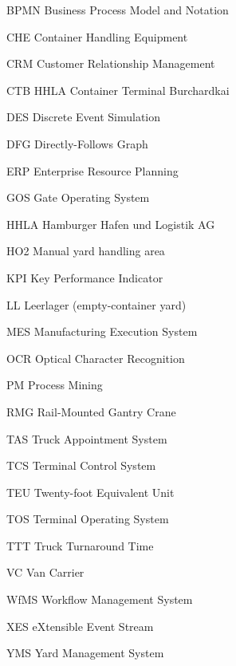 \begin{abbreviations}
    \item[BPMN] Business Process Model and Notation
    \item[CHE] Container Handling Equipment
    \item[CRM] Customer Relationship Management
    \item[CTB] HHLA Container Terminal Burchardkai
    \item[DES] Discrete Event Simulation
    \item[DFG] Directly-Follows Graph
    \item[ERP] Enterprise Resource Planning
    \item[GOS] Gate Operating System
    \item[HHLA] Hamburger Hafen und Logistik AG
    \item[HO2] Manual yard handling area
    \item[KPI] Key Performance Indicator
    \item[LL] Leerlager (empty-container yard)
    \item[MES] Manufacturing Execution System
    \item[OCR] Optical Character Recognition
    \item[PM] Process Mining
    \item[RMG] Rail-Mounted Gantry Crane
    \item[TAS] Truck Appointment System
    \item[TCS] Terminal Control System
    \item[TEU] Twenty-foot Equivalent Unit
    \item[TOS] Terminal Operating System
    \item[TTT] Truck Turnaround Time
    \item[VC] Van Carrier
    \item[WfMS] Workflow Management System
    \item[XES] eXtensible Event Stream
    \item[YMS] Yard Management System
\end{abbreviations}

